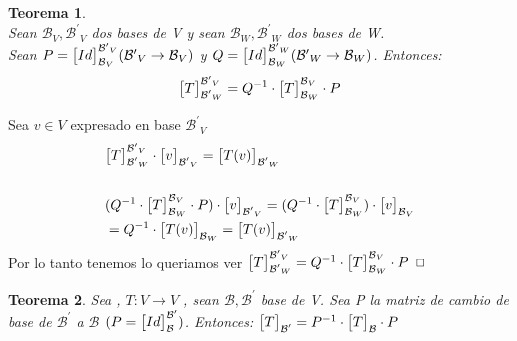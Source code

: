 \documentclass[]{article}
\newtheorem{theorem}{Teorema}
\newenvironment{proof}{\noindent{\bf Prueba:}}{$\hfill \Box$ \vspace{10pt}}
\newcommand{\base}{\text{$\mathcal{B}$}}
\newcommand{\basep}{\text{$\mathcal{B}^{\prime}$}}
\begin{document}
\begin{theorem}
    \\
    Sean $\base_V,\basep_V$ dos bases de V y sean  $\base_W,\basep_W$ dos bases de W.\\
    Sean $P=\cbs{Id}{\base_V}{\basep_V} (\basep_V\to\base_V)$
    y $Q=\cbs{Id}{\base_W}{\basep_W} (\basep_W\to\base_W)$. Entonces:
    \begin{align*}
        \cbs{T}{\basep_W}{\basep_V}= Q^{-1} \cdot \cbs{T}{\base_W}{\base_V} \cdot P
    \end{align*}
\end{theorem}
\begin{proof}
    Sea $v \in V$ expresado en base $\basep_V$
    \begin{align*}
        &\cbs{T}{\basep_W}{\basep_V} \cdot \cbs{v}{\basep_V}{} = \cbs{\T{v}}{\basep_W}{}\\\\
        &(Q^{-1} \cdot \cbs{T}{\base_W}{\base_V} \cdot P )\cdot \cbs{v}{\basep_V}{}
        = (Q^{-1} \cdot \cbs{T}{\base_W}{\base_V}) \cdot \cbs{v}{\base_V}{}\\
        &= Q^{-1} \cdot  \cbs{\T{v}}{\base_W}{} = \cbs{\T{v}}{\basep_W}{}
    \end{align*}
    Por lo tanto tenemos lo queriamos ver $\cbs{T}{\basep_W}{\basep_V}= Q^{-1} \cdot \cbs{T}{\base_W}{\base_V} \cdot P$
\end{proof}

\begin{theorem}
    Sea \espvec , $T:V \to V$ \tl , sean $\base,\basep$ base de V. Sea P la matriz de cambio de base de $\basep$ a $\base$
    $(P=\cbs{Id}{\base}{\basep})$. Entonces: \underline{$\cbs{T}{\basep}{}= P^{-1} \cdot \cbs{T}{\base}{} \cdot P$}
\end{theorem}
\end{document}
